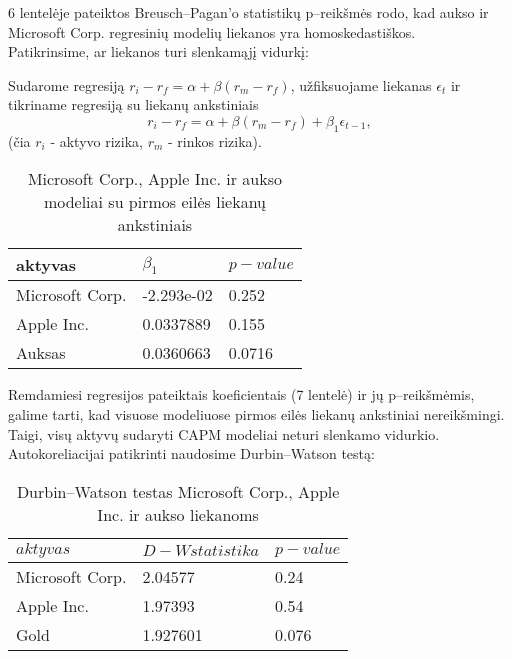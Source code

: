 \documentclass[12pt, a14paper, lithuanian]{article}
\begin{document}
6 lentelėje pateiktos Breusch--Pagan'o statistikų p--reikšmės rodo, kad aukso ir Microsoft Corp. regresinių modelių liekanos yra homoskedastiškos.\\

Patikrinsime, ar liekanos turi slenkamąjį vidurkį:

Sudarome regresiją $ r_i-r_f=\alpha + \beta  (r_m-r_f)  $,
užfiksuojame liekanas $\epsilon_t$ ir tikriname regresiją su liekanų ankstiniais  
$$ r_i-r_f=\alpha + \beta  (r_m-r_f) + \beta_1 \epsilon_{t-1},  $$
(čia $r_i$ - aktyvo rizika, $r_m$ - rinkos rizika).


\begin{table}[ht]
\begin{center}
    \begin{tabular}{ | l | l | l | }
    \hline
    aktyvas  &  $\beta_1$  & $ p-value $  \\
    \hline
	Microsoft Corp. & -2.293e-02 & 0.252\\
	Apple Inc. & 0.0337889 &  0.155\\
	Auksas & 0.0360663 &  0.0716\\
	\hline
    \end{tabular}
\end{center}
\caption{Microsoft Corp., Apple Inc. ir aukso modeliai su pirmos eilės liekanų ankstiniais}
\end{table}

Remdamiesi regresijos pateiktais koeficientais (7 lentelė) ir jų p--reikšmėmis, galime tarti, kad visuose modeliuose pirmos eilės liekanų ankstiniai nereikšmingi. Taigi, visų aktyvų sudaryti CAPM modeliai neturi slenkamo vidurkio.\\

Autokoreliacijai patikrinti naudosime Durbin--Watson testą:



\begin{table}[ht]
\begin{center}
    \begin{tabular}{ | l | l | l | }
    \hline
    $ aktyvas $ & $ D-W statistika $ & $ p-value $  \\
    \hline
	Microsoft Corp. & 2.04577 &  0.24\\
	Apple Inc. & 1.97393 &  0.54\\
	Gold & 1.927601 &  0.076\\
	\hline
    \end{tabular}
\end{center}
\caption{Durbin--Watson testas Microsoft Corp., Apple Inc. ir aukso liekanoms}
\end{table}
\end{document}
